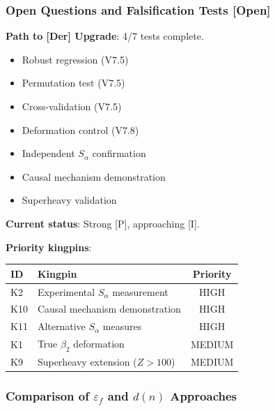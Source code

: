 \subsubsection{Open Questions and Falsification Tests [Open]}
\label{subsubsec:v78-open}

\textbf{Path to [Der] Upgrade}: 4/7 tests complete.
\begin{itemize}
    \item[$\checkmark$] Robust regression (V7.5)
    \item[$\checkmark$] Permutation test (V7.5)
    \item[$\checkmark$] Cross-validation (V7.5)
    \item[$\checkmark$] Deformation control (V7.8)
    \item[$\square$] Independent $S_\alpha$ confirmation
    \item[$\square$] Causal mechanism demonstration
    \item[$\square$] Superheavy validation
\end{itemize}

\textbf{Current status}: Strong [P], approaching [I].

\textbf{Priority kingpins}:
\begin{center}
\begin{tabular}{llc}
\hline
\textbf{ID} & \textbf{Kingpin} & \textbf{Priority} \\
\hline
K2 & Experimental $S_\alpha$ measurement & HIGH \\
K10 & Causal mechanism demonstration & HIGH \\
K11 & Alternative $S_\alpha$ measures & HIGH \\
K1 & True $\beta_2$ deformation & MEDIUM \\
K9 & Superheavy extension ($Z > 100$) & MEDIUM \\
\hline
\end{tabular}
\end{center}

\subsubsection{Comparison of $\varepsilon_f$ and $d(n)$ Approaches}
\label{subsubsec:comparison}

